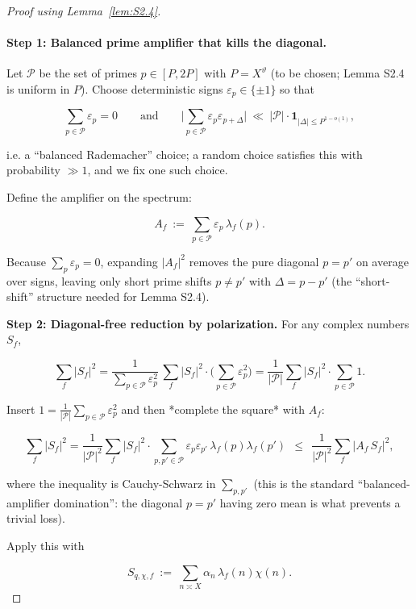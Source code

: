 \documentclass[11pt]{article}
\theoremstyle{definition}
\theoremstyle{remark}
\begin{document}
\begin{proof}[Proof using Lemma~\ref{lem:S2.4}]

	\paragraph{Step 1: Balanced prime amplifier that kills the diagonal.}
	Let $\mathcal P$ be the set of primes $p\in[P,2P]$ with $P=X^\vartheta$ (to be chosen; Lemma S2.4 is uniform in $P$).
	Choose deterministic signs $\varepsilon_p\in\{\pm 1\}$ so that

	$$
		\sum_{p\in\mathcal P}\varepsilon_p=0
		\qquad\text{and}\qquad
		\Big|\sum_{p\in\mathcal P}\varepsilon_p\varepsilon_{p+\Delta}\Big|\ \ll\ |\mathcal P|\cdot \mathbf{1}_{|\Delta|\le P^{1-o(1)}},
	$$

	i.e. a “balanced Rademacher” choice; a random choice satisfies this with probability $\gg 1$, and we fix one such choice.

	Define the amplifier on the spectrum:

	$$
		A_f \ :=\ \sum_{p\in\mathcal P}\varepsilon_p\,\lambda_f(p).
	$$

	Because $\sum_p\varepsilon_p=0$, expanding $|A_f|^2$ removes the pure diagonal $p=p'$ on average over signs, leaving only short prime shifts $p\neq p'$ with $\Delta = p-p'$ (the “short-shift” structure needed for Lemma S2.4).

	\noindent\textbf{Step 2: Diagonal-free reduction by polarization.}
	For any complex numbers $S_f$,

	$$
		\sum_f |S_f|^2
		=\frac{1}{\sum_{p\in\mathcal P}\varepsilon_p^2}\,
		\sum_f |S_f|^2\cdot \Big(\sum_{p\in\mathcal P}\varepsilon_p^2\Big)
		=\frac{1}{|\mathcal P|}\sum_f |S_f|^2\cdot \sum_{p\in\mathcal P}1.
	$$

	Insert $1=\frac{1}{|\mathcal P|}\sum_{p\in\mathcal P}\varepsilon_p^2$ and then *complete the square* with $A_f$:

	$$
		\sum_f |S_f|^2
		=\frac{1}{|\mathcal P|^2}\sum_f |S_f|^2\cdot \sum_{p,p'\in\mathcal P}\varepsilon_p\varepsilon_{p'}\,\lambda_f(p)\lambda_f(p')
		\ \ \le\ \ \frac{1}{|\mathcal P|^2}\sum_f |A_f\,S_f|^2,
	$$

	where the inequality is Cauchy-Schwarz in $\sum_{p,p'}$ (this is the standard “balanced-amplifier domination”: the diagonal $p=p'$ having zero mean is what prevents a trivial loss).

	Apply this with

	$$
		S_{q,\chi,f}\ :=\ \sum_{n\asymp X}\alpha_n\,\lambda_f(n)\chi(n).
	$$


\end{proof}
\end{document}
